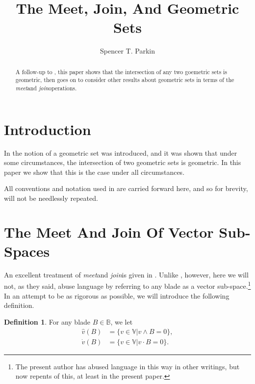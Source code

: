 \documentclass{birkjour}
\theoremstyle{definition}
\newtheorem{defn}[thm]{Definition}
\theoremstyle{remark}
\numberwithin{equation}{section}
\newcommand{\B}{\mathbb{B}}
\newcommand{\V}{\mathbb{V}}
\newcommand{\meet}{{\it meet}\;}
\newcommand{\join}{{\it join}\;}
\newcommand{\vd}{\dot{v}}
\newcommand{\vh}{\hat{v}}
\begin{document}
\title{The Meet, Join, And Geometric Sets}

\author{Spencer T. Parkin}
\address{102 W. 500 S., \\
Salt Lake City, UT  84101} 



\begin{abstract}
A follow-up to \cite{}, this paper shows that the intersection of
any two goemetric sets is geometric, then goes on to consider other
results about geometric sets in terms of the \meet and \join operations.
\end{abstract}


\maketitle

\section{Introduction}

In \cite{} the notion of a geometric set was introduced, and it was shown that under
some circumstances, the intersection of two geometric sets is geometric.  In this paper
we show that this is the case under all circumstances.

All conventions and notation used in \cite{} are carried forward here, and
so for brevity, will not be needlessly repeated.

\section{The Meet And Join Of Vector Sub-Spaces}

An excellent treatment of \meet and \join is given in \cite{}.
Unlike \cite{}, however, here we will not, as they said, abuse language by referring to
any blade as a vector sub-space.\footnote{The present author has abused language
in this way in other writings, but now repents of this, at least in the present paper.}  In an attempt to be as
rigorous as possible, we will introduce the following definition.
\begin{defn}
For any blade $B\in\B$, we let
\begin{align}
\vh(B) &= \{v\in\V|v\wedge B=0\}, \\
\vd(B) &= \{v\in\V|v\cdot B=0\}.
\end{align}
\end{defn}
\end{document}
